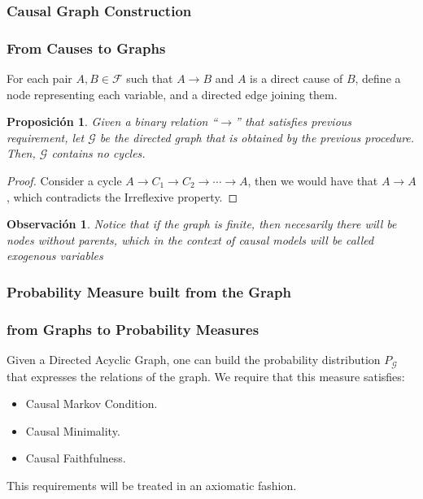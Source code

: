 \documentclass{beamer}
\theoremstyle{plain}
\newtheorem{prop}[teo]{Proposición}
\newtheorem{obs}[teo]{Observación}
\begin{document}
		\subsubsection{Causal Graph Construction}
		\begin{frame}
		\frametitle{From Causes to Graphs}
		For each pair $A,B \in \mathcal{F}$ such that $A \to B$ and $A$ is a direct cause of $B$, define a node representing each variable, and a directed edge joining them.
		\begin{prop}
		Given a binary relation “$\to$” that satisfies previous requirement, let $\mathcal{G}$ be the directed graph that is obtained by the previous procedure. Then, $\mathcal{G}$ contains no cycles.
		\end{prop}
		\begin{proof}
		Consider a cycle $A \to C_1 \to C_2 \to \cdots \to A$, then we would have that $A \to A$, which contradicts the Irreflexive property.
		\end{proof}
		\end{frame}
		\begin{frame}
		\begin{obs}
		Notice that if the graph is finite, then necesarily there will be nodes without parents, which in the context of causal models will be called exogenous variables
		\end{obs}
		\end{frame}
		\subsubsection{Probability Measure built from the Graph}
		\begin{frame}
		\frametitle{from Graphs to Probability Measures}
		Given a Directed Acyclic Graph, one can build the probability distribution $P_\mathcal{G}$ that expresses the relations of the graph. We require that this measure satisfies:
        \begin{itemize}
        \item Causal Markov Condition.
        \item Causal Minimality.
         \item Causal Faithfulness.
\end{itemize}
This requirements will be treated in an axiomatic fashion.
		\end{frame}
\end{document}
